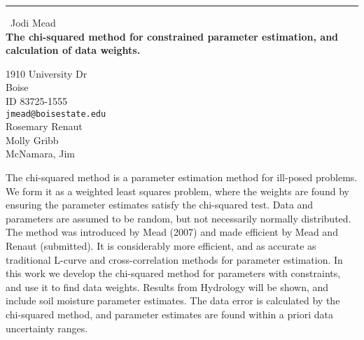 \documentclass{report}
\begin{document}
\begin{center}
\rule{6in}{1pt} \
{\large Jodi Mead \\
{\bf The chi-squared method for constrained parameter estimation, and calculation of data weights.}}

1910 University Dr \\ Boise \\ ID 83725-1555
\\
{\tt jmead@boisestate.edu}\\
Rosemary Renaut\\
Molly Gribb\\
	McNamara, Jim\end{center}

The chi-squared method is a parameter estimation method for ill-posed
problems. We form it as a weighted least squares problem, where the
weights are found by ensuring the parameter estimates satisfy the
chi-squared test. Data and parameters are assumed to be random, but not
necessarily normally distributed. The method was introduced by Mead
(2007) and made efficient by Mead and Renaut (submitted). It is
considerably more efficient, and as accurate as traditional L-curve and
cross-correlation methods for parameter estimation. In this work we
develop the chi-squared method for parameters with constraints, and use
it to find data weights. Results from Hydrology will be shown, and
include soil moisture parameter estimates. The data error is calculated
by the chi-squared method, and parameter estimates are found within a
priori data uncertainty ranges.
\end{document}

